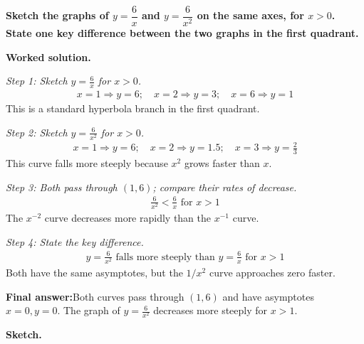 \documentclass[11pt]{article}
\newcommand{\question}[1]{\par\medskip\noindent\textbf{#1}\par}
\begin{document}
\question{Sketch the graphs of \( y = \dfrac{6}{x} \) and \( y = \dfrac{6}{x^2} \) on the same axes, for \( x > 0 \). State one key difference between the two graphs in the first quadrant.}

\textbf{Worked solution.}

\textit{Step 1: Sketch \( y = \frac{6}{x} \) for \( x > 0 \).}
\[\begin{gathered}
x = 1 \Rightarrow y = 6; \quad x = 2 \Rightarrow y = 3; \quad x = 6 \Rightarrow y = 1
\end{gathered}\]
This is a standard hyperbola branch in the first quadrant.

\textit{Step 2: Sketch \( y = \frac{6}{x^2} \) for \( x > 0 \).}
\[\begin{gathered}
x = 1 \Rightarrow y = 6; \quad x = 2 \Rightarrow y = 1.5; \quad x = 3 \Rightarrow y = \tfrac{2}{3}
\end{gathered}\]
This curve falls more steeply because \( x^2 \) grows faster than \( x \).

\textit{Step 3: Both pass through \( (1, 6) \); compare their rates of decrease.}
\[\begin{gathered}
\frac{6}{x^2} < \frac{6}{x} \text{ for } x > 1
\end{gathered}\]
The \( x^{-2} \) curve decreases more rapidly than the \( x^{-1} \) curve.

\textit{Step 4: State the key difference.}
\[\begin{gathered}
y = \frac{6}{x^2} \text{ falls more steeply than } y = \frac{6}{x} \text{ for } x > 1
\end{gathered}\]
Both have the same asymptotes, but the \( 1/x^2 \) curve approaches zero faster.

\begin{answerbox}
\textbf{Final answer:}\quad Both curves pass through \(\displaystyle (1,6)\) and have asymptotes \(\displaystyle x=0, y=0\). The graph of \(\displaystyle y = \frac{6}{x^2}\) decreases more steeply for \(\displaystyle x > 1\).
\end{answerbox}
\textbf{Sketch.}
\end{document}
